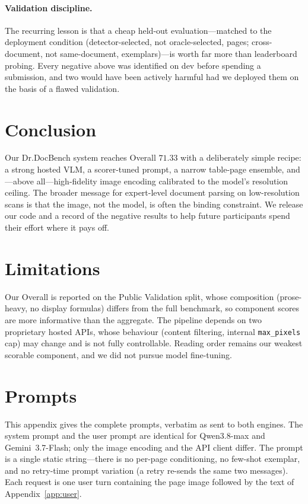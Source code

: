 \documentclass[11pt]{article}
\begin{document}
\paragraph{Validation discipline.} The recurring lesson is that a cheap held-out
evaluation---matched to the deployment condition (detector-selected, not
oracle-selected, pages; cross-document, not same-document, exemplars)---is worth far
more than leaderboard probing. Every negative above was identified on dev before
spending a submission, and two would have been actively harmful had we deployed them
on the basis of a flawed validation.

\section{Conclusion}
Our Dr.DocBench system reaches Overall $71.33$ with a deliberately simple recipe: a
strong hosted VLM, a scorer-tuned prompt, a narrow table-page ensemble, and---above
all---high-fidelity image encoding calibrated to the model's resolution ceiling. The
broader message for expert-level document parsing on low-resolution scans is that
the image, not the model, is often the binding constraint. We release our code and a
record of the negative results to help future participants spend their effort where
it pays off.

\section*{Limitations}
Our Overall is reported on the Public Validation split, whose composition (prose-heavy,
no display formulas) differs from the full benchmark, so component scores are more
informative than the aggregate. The pipeline depends on two proprietary hosted APIs,
whose behaviour (content filtering, internal \texttt{max\_pixels} cap) may change and
is not fully controllable. Reading order remains our weakest scorable component, and
we did not pursue model fine-tuning.

\makeatletter
\ifacl@linenumbers\else\balance\fi
\makeatother


\appendix

\section{Prompts}
\label{app:prompts}
This appendix gives the complete prompts, verbatim as sent to both engines. The
system prompt and the user prompt are identical for Qwen3.8-max and
Gemini~3.7-Flash; only the image encoding and the API client differ. The prompt is
a single static string---there is no per-page conditioning, no few-shot exemplar,
and no retry-time prompt variation (a retry re-sends the same two messages). Each
request is one user turn containing the page image followed by the text of
Appendix~\ref{app:user}.
\end{document}
